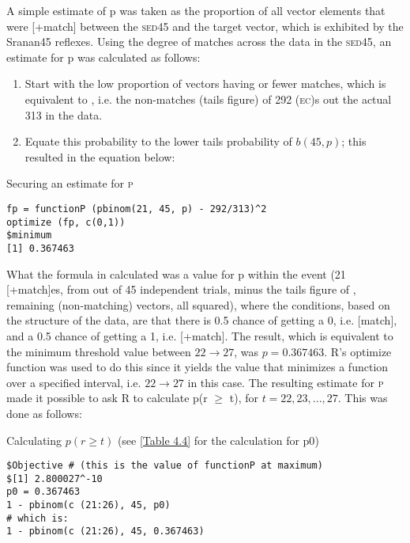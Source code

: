 A simple estimate of p was taken as the proportion of all vector elements that were [+match] between the \textsc{sed45} and the target vector, which is exhibited by the Sranan45 reflexes. Using the degree of matches across the data in the \textsc{sed45}, an estimate for p was calculated as follows:

\begin{enumerate}
\item {Start with the low proportion of vectors having  or fewer matches, which is equivalent to ,  i.e. the non-matches (tails figure) of 292 (\textsc{ec})s out the actual 313 in the data.}
\item{Equate this probability to the lower tails probability of $b(45, p)$; this resulted in the equation below:}
\end{enumerate}


\ea\label{Table 4.4}Securing an estimate for \textsc{p}\\
\begin{lstlisting}
fp = functionP (pbinom(21, 45, p) - 292/313)^2
optimize (fp, c(0,1))
$minimum
[1] 0.367463
\end{lstlisting}
\z

What the formula in  calculated was a value for p within the event (21 [+match]es, from out of 45 independent trials, minus the tails figure of , remaining (non-matching) vectors, all squared), where the conditions, based on the structure of the data, are that there is 0.5 chance of getting a 0, i.e. [\textminus{}match], and a 0.5 chance of getting a 1, i.e. [+match]. The result, which is equivalent to the minimum threshold value between $22\rightarrow27$, was $p = 0.367463$. R's optimize function was used to do this since it yields the value that minimizes a function over a specified interval, i.e. $22\rightarrow27$ in this case. The resulting estimate for \textsc{p} made it possible to ask R to calculate p(r $\geq$ t), for $t = 22, 23, ..., 27$. This was done as follows:
\clearpage

\ea Calculating $p(r \geq t)$ (see \ref{Table 4.4} for the calculation for {\ttfamily p0})\\\label{Table 4.5}
\begin{lstlisting}
$Objective # (this is the value of functionP at maximum)
$[1] 2.800027^-10 
p0 = 0.367463 
1 - pbinom(c (21:26), 45, p0) 
# which is: 
1 - pbinom(c (21:26), 45, 0.367463)
\end{lstlisting}
\z

